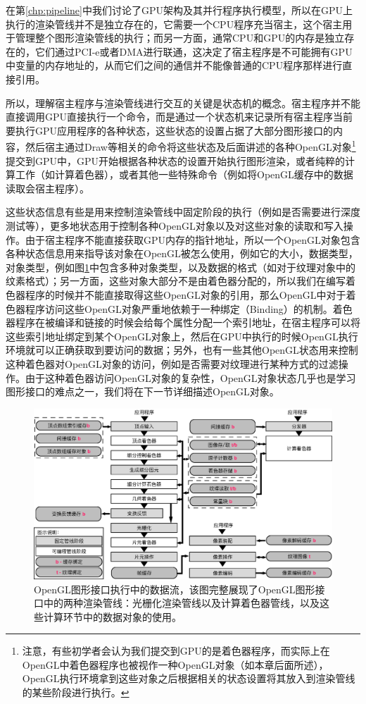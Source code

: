在第\ref{chp:pipeline}中我们讨论了GPU架构及其并行程序执行模型，所以在GPU上执行的渲染管线并不是独立存在的，它需要一个CPU程序充当宿主，这个宿主用于管理整个图形渲染管线的执行；而另一方面，通常CPU和GPU的内存是独立存在的，它们通过PCI-e或者DMA进行联通，这决定了宿主程序是不可能拥有GPU中变量的内存地址的，从而它们之间的通信并不能像普通的CPU程序那样进行直接引用。

所以，理解宿主程序与渲染管线进行交互的关键是状态机的概念。宿主程序并不能直接调用GPU直接执行一个命令，而是通过一个状态机来记录所有宿主程序当前要执行GPU应用程序的各种状态，这些状态的设置占据了大部分图形接口的内容，然后宿主通过Draw等相关的命令将这些状态及后面讲述的各种OpenGL对象\footnote{注意，有些初学者会认为我们提交到GPU的是着色器程序，而实际上在OpenGL中着色器程序也被视作一种OpenGL对象（如本章后面所述），OpenGL执行环境拿到这些对象之后根据相关的状态设置将其放入到渲染管线的某些阶段进行执行。}提交到GPU中，GPU开始根据各种状态的设置开始执行图形渲染，或者纯粹的计算工作（如计算着色器），或者其他一些特殊命令（例如将OpenGL缓存中的数据读取会宿主程序）。

这些状态信息有些是用来控制渲染管线中固定阶段的执行（例如是否需要进行深度测试等），更多地状态用于控制各种OpenGL对象以及对这些对象的读取和写入操作。由于宿主程序不能直接获取GPU内存的指针地址，所以一个OpenGL对象包含各种状态信息用来指导该对象在OpenGL被怎么使用，例如它的大小，数据类型，对象类型，例如图\ref{f:api-pipeline}中包含多种对象类型，以及数据的格式（如对于纹理对象中的纹素格式）；另一方面，这些对象大部分不是由着色器分配的，所以我们在编写着色器程序的时候并不能直接取得这些OpenGL对象的引用，那么OpenGL中对于着色器程序访问这些OpenGL对象严重地依赖于一种绑定（Binding）的机制。着色器程序在被编译和链接的时候会给每个属性分配一个索引地址，在宿主程序可以将这些索引地址绑定到某个OpenGL对象上，然后在GPU中执行的时候OpenGL执行环境就可以正确获取到要访问的数据；另外，也有一些其他OpenGL状态用来控制这种着色器对OpenGL对象的访问，例如是否需要对纹理进行某种方式的过滤操作。由于这种着色器访问OpenGL对象的复杂性，OpenGL对象状态几乎也是学习图形接口的难点之一，我们将在下一节详细描述OpenGL对象。

\begin{figure}
\begin{fullwidth}
	\includegraphics[width=1.0\thewidth]{figures/api/pipeline}
	\caption{OpenGL图形接口执行中的数据流，该图完整展现了OpenGL图形接口中的两种渲染管线：光栅化渲染管线以及计算着色器管线，以及这些计算环节中的数据对象的使用。}
	\label{f:api-pipeline}
\end{fullwidth}
\end{figure}

